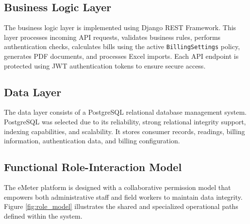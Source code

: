 \documentclass[12pt, a4paper, onecolumn]{report}
\begin{document}
\subsection{Business Logic Layer}
The business logic layer is implemented using Django REST Framework. This layer processes incoming API requests, validates business rules, performs authentication checks, calculates bills using the active \texttt{BillingSettings} policy, generates PDF documents, and processes Excel imports. Each API endpoint is protected using JWT authentication tokens to ensure secure access.

\subsection{Data Layer}
The data layer consists of a PostgreSQL relational database management system. PostgreSQL was selected due to its reliability, strong relational integrity support, indexing capabilities, and scalability. It stores consumer records, readings, billing information, authentication data, and billing configuration.

\subsection{Functional Role-Interaction Model}
The eMeter platform is designed with a collaborative permission model that empowers both administrative staff and field workers to maintain data integrity. Figure \ref{fig:role_model} illustrates the shared and specialized operational paths defined within the system.
\end{document}
